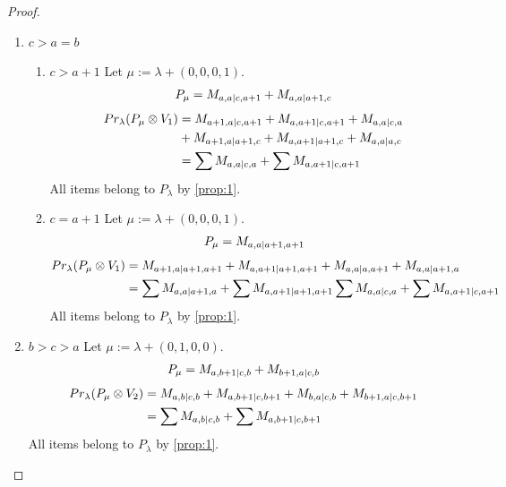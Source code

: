 \documentclass[12pt,a4paper]{article}
\begin{document}
\begin{proof}
\begin{enumerate}
\item $c>a=b$ 
  \begin{enumerate}
    \item $c>a+1$
        Let $\mu:=\lambda + (0,0,0,1) $. 
\begin{equation}\notag
  \begin{aligned}
      P_{\mu} =
M_{a,a|c,a+1}
+M_{a,a|a+1,c}
  \end{aligned}
\end{equation}
\begin{equation}\notag
  \begin{aligned}
    Pr_{\lambda}(P_\mu \otimes V_1) &=
M_{a+1,a|c,a+1}
+M_{a,a+1|c,a+1}
+M_{a,a|c,a} \\
                                    &+
M_{a+1,a|a+1,c}
+M_{a,a+1|a+1,c}
+M_{a,a|a,c} \\
                                    &=
\sum M_{a,a|c,a}
+\sum M_{a,a+1|c,a+1}
  \end{aligned}
\end{equation}
All items belong to $P_\lambda$ by \cref{prop:1}.

    \item $c=a+1$
        Let $\mu:=\lambda + (0,0,0,1) $. 
\begin{equation}\notag
  \begin{aligned}
      P_{\mu} =
M_{a,a|a+1,a+1}
  \end{aligned}
\end{equation}
\begin{equation}\notag
  \begin{aligned}
    Pr_{\lambda}(P_\mu \otimes V_1) &=
M_{a+1,a|a+1,a+1}
+M_{a,a+1|a+1,a+1} 
+M_{a,a|a,a+1}
+M_{a,a|a+1,a} \\
                                    &=
\sum M_{a,a|a+1,a}
+\sum M_{a,a+1|a+1,a+1}
\sum M_{a,a|c,a}
+\sum M_{a,a+1|c,a+1}
  \end{aligned}
\end{equation}
All items belong to $P_\lambda$ by \cref{prop:1}.
  \end{enumerate}

\item $b>c>a$
        Let $\mu:=\lambda + (0,1,0,0) $. 
\begin{equation}\notag
  \begin{aligned}
      P_{\mu} =
M_{a,b+1|c,b}
+M_{b+1,a|c,b}
  \end{aligned}
\end{equation}
\begin{equation}\notag
  \begin{aligned}
    Pr_{\lambda}(P_\mu \otimes V_2) &=
M_{a,b|c,b}
+M_{a,b+1|c,b+1}
+M_{b,a|c,b}
+M_{b+1,a|c,b+1} \\
                                    &=
\sum M_{a,b|c,b}
+\sum M_{a,b+1|c,b+1}
  \end{aligned}
\end{equation}
All items belong to $P_\lambda$ by \cref{prop:1}.


\end{enumerate}
\end{proof}
\end{document}
